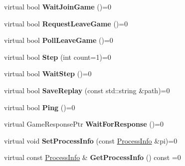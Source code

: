 \begin{DoxyCompactItemize}
virtual bool {\bfseries Wait\+Join\+Game} ()=0
\item 
\mbox{\label{classsc2_1_1_control_interface_ab4fbb92be4e178ab662770155c7b0cd0}} 
virtual bool {\bfseries Request\+Leave\+Game} ()=0
\item 
\mbox{\label{classsc2_1_1_control_interface_a9858c7bc4cf9485e958d96e518bd5268}} 
virtual bool {\bfseries Poll\+Leave\+Game} ()=0
\item 
\mbox{\label{classsc2_1_1_control_interface_ac4051c302ac0aff7892b7b3dac834bff}} 
virtual bool {\bfseries Step} (int count=1)=0
\item 
\mbox{\label{classsc2_1_1_control_interface_afdceac1202a0160a4bb8bcea6ab227c1}} 
virtual bool {\bfseries Wait\+Step} ()=0
\item 
\mbox{\label{classsc2_1_1_control_interface_a3e9f1c13939a03abccfc73191cc7fdcf}} 
virtual bool {\bfseries Save\+Replay} (const std\+::string \&path)=0
\item 
\mbox{\label{classsc2_1_1_control_interface_a98c730f6414edaa5166890dede1fe83c}} 
virtual bool {\bfseries Ping} ()=0
\item 
\mbox{\label{classsc2_1_1_control_interface_a02fe1bf89ffb788392bf7707ba9fc049}} 
virtual Game\+Response\+Ptr {\bfseries Wait\+For\+Response} ()=0
\item 
\mbox{\label{classsc2_1_1_control_interface_a869db0749b2f5db41731886cc7fe9d87}} 
virtual void {\bfseries Set\+Process\+Info} (const \hyperlink{structsc2_1_1_process_info}{Process\+Info} \&pi)=0
\item 
\mbox{\label{classsc2_1_1_control_interface_a190f45b9169d5e17cdf48cc906bd70e3}} 
virtual const \hyperlink{structsc2_1_1_process_info}{Process\+Info} \& {\bfseries Get\+Process\+Info} () const =0
\item 
\mbox{\label{classsc2_1_1_control_interface_a7856754a90ef19fce1c37d532940cc70}} 

\end{DoxyCompactItemize}
